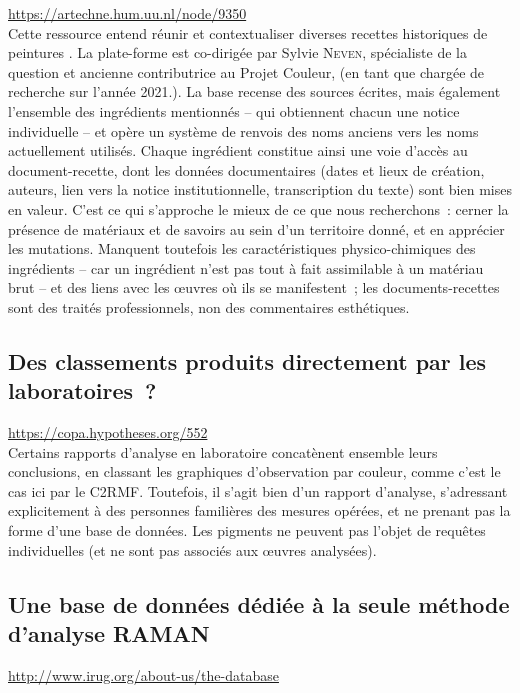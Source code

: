 \documentclass[a4paper,12pt, twoside]{book}
\begin{document}
\url{https://artechne.hum.uu.nl/node/9350}\\

Cette ressource entend réunir et contextualiser diverses recettes historiques de peintures . La plate-forme est co-dirigée par Sylvie \textsc{Neven}, spécialiste de la question et ancienne contributrice au Projet Couleur, (en tant que chargée de recherche sur l’année 2021.). La base recense des sources écrites, mais également l’ensemble des ingrédients mentionnés – qui obtiennent chacun une notice individuelle – et opère un système de renvois des noms anciens vers les noms actuellement utilisés. Chaque ingrédient constitue ainsi une voie d’accès au document-recette, dont les données documentaires (dates et lieux de création, auteurs, lien vers la notice institutionnelle, transcription du texte) sont bien mises en valeur. C’est ce qui s’approche le mieux de ce que nous recherchons~: cerner la présence de matériaux et de savoirs au sein d’un territoire donné, et en apprécier les mutations. Manquent toutefois les caractéristiques physico-chimiques des ingrédients – car un ingrédient n’est pas tout à fait assimilable à un matériau brut – et des liens avec les œuvres où ils se manifestent~; les documents-recettes sont des traités professionnels, non des commentaires esthétiques.

\subsection*{Des classements produits directement par les laboratoires~?}

\url{https://copa.hypotheses.org/552}\\

Certains rapports d’analyse en laboratoire concatènent ensemble leurs conclusions, en classant les graphiques d’observation par couleur, comme c’est le cas ici par le C2RMF. Toutefois, il s’agit bien d’un rapport d’analyse, s’adressant explicitement à des personnes familières des mesures opérées, et ne prenant pas la forme d’une base de données. Les pigments ne peuvent pas l’objet de requêtes individuelles (et ne sont pas associés aux œuvres analysées).

\subsection*{Une base de données dédiée à la seule méthode d’analyse RAMAN}

\url{http://www.irug.org/about-us/the-database}\\
\end{document}
